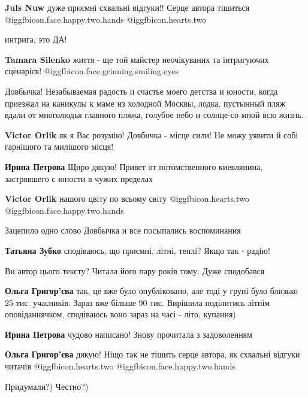 \begin{itemize}
\textbf{Juls Nuw} дуже приємні схвальні відгуки!! Серце автора тішиться @igg{fbicon.face.happy.two.hands}  @igg{fbicon.hearts.two} 

интрига, это ДА!

\textbf{Tamara Silenko} життя - ще той майстер неочікуваних та інтригуючих сценарієв! @igg{fbicon.face.grinning.smiling.eyes} 


Довбычка! Незабываемая радость и счастье моего детства и юности, когда приезжал
на каникулы к маме из холодной Москвы, лодка, пустынный пляж вдали от
многолюдья главного пляжа, голубое небо и солнце-со мной всю жизнь.

\begin{itemize} %
\textbf{Victor Orlik} як я Вас розумію! Довбичка - місце сили! Не можу уявити й собі гарнішого та милішого місця!

\textbf{Ирина Петрова} Щиро дякую! Привет от потомственного киевлянина, застрявшего с юности в чужих пределах

\textbf{Victor Orlik} нашого цвіту по всьому світу @igg{fbicon.hearts.two}  @igg{fbicon.face.happy.two.hands} 
\end{itemize} %

Зацепило одно слово Довбычка и все посыпались воспоминания

\textbf{Татьяна Зубко} сподіваюсь, що приємні, літні, теплі? Якщо так - радію!

Ви автор цього тексту? Читала його пару років тому. Дуже сподобався

\begin{itemize} %
\textbf{Ольга Григор'єва} так, це вже було опубліковано, але тоді у групі було близько 25 тис. учасників. Зараз вже більше 90 тис. Вирішила поділитись літнім оповіданнячком, сподіваюсь воно зараз на часі - літо, купання)

\textbf{Ирина Петрова} чудово написано! Знову прочитала з задоволенням

\textbf{Ольга Григор'єва} дякую! Ніщо так не тішить серце автора, як схвальні відгуки читачів @igg{fbicon.hearts.two}  @igg{fbicon.face.happy.two.hands} 
\end{itemize} %

Придумали?) Честно?)


\end{itemize}
